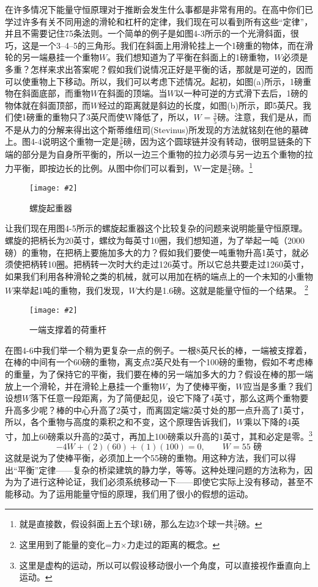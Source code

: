 \documentclass[12pt,oneside]{book}
\newenvironment{fig}[2][1]
{\begin{figure}[H]
\centering
\texttt{[image: \#2]}}
{\end{figure}}
\begin{document}
在许多情况下能量守恒原理对于推断会发生什么事都是非常有用的。在高中你们已学过许多有关不同用途的滑轮和杠杆的定律，我们现在可以看到所有这些“定律”，并且不需要记住75条法则。一个简单的例子是如图4-3所示的一个光滑斜面，很巧，这是一个3--4--5的三角形。我们在斜面上用滑轮挂上一个1磅重的物体，而在滑轮的另一端悬挂一个重物$ W $。我们想知道为了平衡在斜面上的1磅重物，$ W $必须是多重？怎样来求出答案呢？假如我们说情况正好是平衡的话，那就是可逆的，因而可以使重物上下移动。所以，我们可以考虑下述情况。起初，如图(a)所示，1磅重物在斜面底部，而重物$ W $在斜面的顶端。当$ W $以一种可逆的方式滑下去后，1磅的物体就在斜面顶部，而$ W $经过的距离就是斜边的长度，如图(b)所示，即5英尺。我们使1磅重的重物只了3英尺而使W降低了，所以，$ W=\frac{3}{5} $磅。注意，我们是从，而不是从力的分解来得出这个斯蒂维纽司(Stevinus)所发现的方法就铭刻在他的墓碑上。图4-4说明这个重物一定是$ \frac{3}{5} $磅，因为这个圆球链并没有转动，很明显链条的下端的部分是为自身所平衡的，所以一边三个重物的拉力必须与另一边五个重物的拉力平衡，即按边长的比例。从图中你们可以看到，W一定是$ \frac{3}{5} $磅。\footnote{就是直接数，假设斜面上五个球1磅，那么左边3个球一共$\frac{3}{5} $磅。}
\begin{fig}{螺旋起重器}
\caption{螺旋起重器}
\label{fig:螺旋起重器}
\end{fig}
让我们现在用图4-5所示的螺旋起重器这个比较复杂的问题来说明能量守恒原理。螺旋的把柄长为20英寸，螺纹为每英寸10圈，我们想知道，为了举起一吨（2000磅）的重物，在把柄上要施加多大的力？假如我们要使一吨重物升高1英寸，就必须使把柄转10圈。把柄转一次时大约走过126英寸。所以它总共要走过1260英寸，如果我们利用各种滑轮之类的机械，就可以用加在柄的端点上的一个未知的小重物$ W $来举起1吨的重物，我们发现，$ W $大约是1.6磅。这就是能量守恒的一个结果。
\footnote{这里用到了能量的变化=力$ \times $力走过的距离的概念。}
\begin{fig}{一端支撑着的荷重杆}
\caption{一端支撑着的荷重杆}
\label{fig:一端支撑着的荷重杆}
\end{fig}
在图4-6中我们举一个稍为更复杂一点的例子。一根8英尺长的棒，一端被支撑着，在棒的中间有一个60磅的重物，离支点2英尺处有一个100磅的重物，假如不考虑棒的重量，为了保持它的平衡，我们要在棒的另一端加多大的力？假设在棒的那一端放上一个滑轮，并在滑轮上悬挂一个重物$ W $，为了使棒平衡，$ W $应当是多重？我们设想$ W $落下任意一段距离，为了简便起见，设它下降了4英寸，那么这两个重物要升高多少呢？棒的中心升高了2英寸，而离固定端2英寸处的那一点升高了1英寸，所以，各个重物与高度的乘积之和不变，这个原理告诉我们，$ W $乘以下降的4英寸，加上60磅乘以升高的2英寸，再加上100磅乘以升高的1英寸，其和必定是零。\footnote{这里是虚构的运动，所以可以假设移动很小一个角度，可以直接视作垂直向上运动。}
\begin{equation}
\label{Eq:I:4:5}
-4W+(2)(60)+(1)(100)=0,\qquad
W=\text{$55$ 磅}
\end{equation}
这就是说为了使棒平衡，必须加上一个55磅的重物。用这种方法，我们可以得出“平衡”定律——复杂的桥梁建筑的静力学，等等。这种处理问题的方法称为，因为为了进行这种论证，我们必须系统移动一下——即使它实际上没有移动，甚至不能移动。为了运用能量守恒的原理，我们用了很小的假想的运动。
\end{document}
